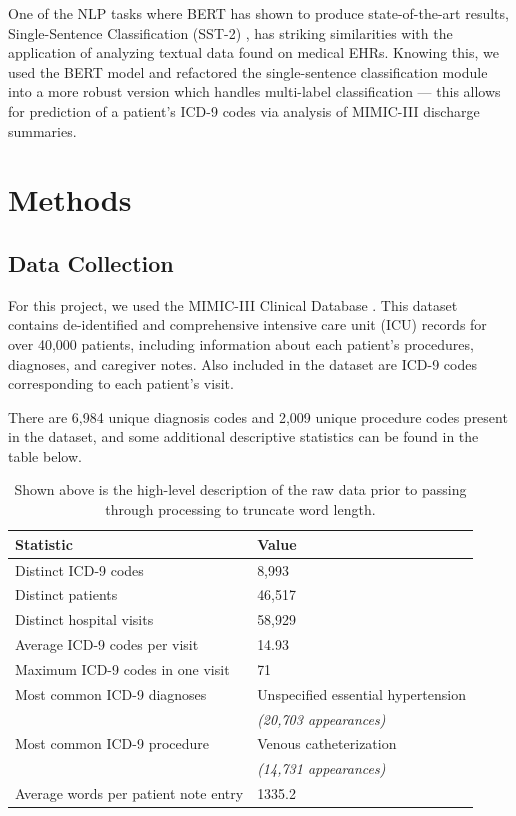 \documentclass[fleqn,10pt]{olplainarticle}
\begin{document}
One of the NLP tasks where BERT has shown to produce state-of-the-art results, Single-Sentence Classification (SST-2) \cite{bertPaper}, has striking similarities with the application of analyzing textual data found on medical EHRs. Knowing this, we used the BERT model and refactored the single-sentence classification module into a more robust version which handles multi-label classification --- this allows for prediction of a patient's ICD-9 codes via analysis of MIMIC-III discharge summaries.


\section{Methods}

\subsection{Data Collection}

For this project, we used the MIMIC-III Clinical Database \cite{mimicIII}. This dataset contains de-identified and comprehensive intensive care unit (ICU) records for over 40,000 patients, including information about each patient’s procedures, diagnoses, and caregiver notes. Also included in the dataset are ICD-9 codes corresponding to each patient’s visit. 

There are 6,984 unique diagnosis codes and 2,009 unique procedure codes present in the dataset, and some additional descriptive statistics can be found in the table below.

\begin{table}[ht]
\centering
\begin{tabular}{l|l}\hline
\textbf{Statistic} & \textbf{Value} \\\hline\hline
Distinct ICD-9 codes & 8,993 \\
Distinct patients & 46,517 \\
Distinct hospital visits & 58,929 \\
Average ICD-9 codes per visit & 14.93 \\
Maximum ICD-9 codes in one visit & 71 \\
Most common ICD-9 diagnoses & Unspecified essential hypertension  \\
 & \textit{(20,703 appearances)} \\
Most common ICD-9 procedure & Venous catheterization \\
 & \textit{(14,731 appearances)} \\
Average words per patient note entry & 1335.2 \\
\hline\hline
\end{tabular}
\caption{\label{tab:widgets}Shown above is the high-level description of the raw data prior to passing through processing to truncate word length.}
\end{table}
\end{document}
